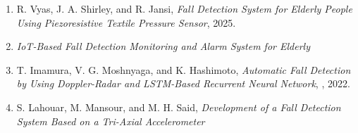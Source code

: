 \documentclass[a4paper, 12pt]{report}
\begin{document}
\begin{enumerate}
    \item R. Vyas, J. A. Shirley, and R. Jansi, \textit{Fall Detection System for Elderly People Using Piezoresistive Textile Pressure Sensor}, 2025.

    \item  \textit{IoT-Based Fall Detection Monitoring and Alarm System for Elderly} 

    \item T. Imamura, V. G. Moshnyaga, and K. Hashimoto, \textit{Automatic Fall Detection by Using Doppler-Radar and LSTM-Based Recurrent Neural Network}, , 2022.

    \item S. Lahouar, M. Mansour, and M. H. Said, \textit{Development of a Fall Detection System Based on a Tri-Axial Accelerometer}
\end{enumerate}
\end{document}
